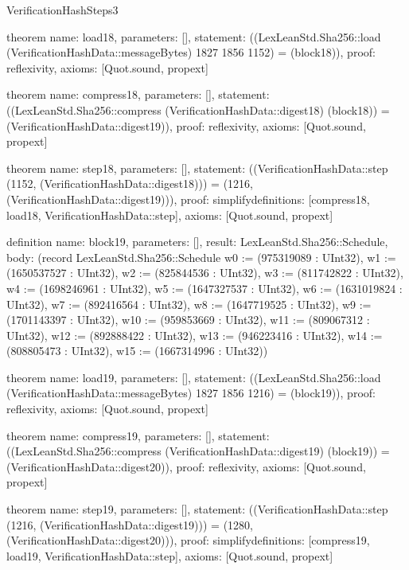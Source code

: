 \begin{lexlean}{VerificationHashSteps3}
\begin{semanticmodule}
theorem{
  name: load18,
  parameters: [],
  statement: ((LexLeanStd.Sha256::load (VerificationHashData::messageBytes) 1827 1856 1152) = (block18)),
  proof: reflexivity{},
  axioms: [Quot.sound, propext]
}

theorem{
  name: compress18,
  parameters: [],
  statement: ((LexLeanStd.Sha256::compress (VerificationHashData::digest18) (block18)) = (VerificationHashData::digest19)),
  proof: reflexivity{},
  axioms: [Quot.sound, propext]
}

theorem{
  name: step18,
  parameters: [],
  statement: ((VerificationHashData::step (1152, (VerificationHashData::digest18))) = (1216, (VerificationHashData::digest19))),
  proof: simplify{definitions: [compress18, load18, VerificationHashData::step]},
  axioms: [Quot.sound, propext]
}

definition{
  name: block19,
  parameters: [],
  result: LexLeanStd.Sha256::Schedule,
  body: (record LexLeanStd.Sha256::Schedule {w0 := (975319089 : UInt32), w1 := (1650537527 : UInt32), w2 := (825844536 : UInt32), w3 := (811742822 : UInt32), w4 := (1698246961 : UInt32), w5 := (1647327537 : UInt32), w6 := (1631019824 : UInt32), w7 := (892416564 : UInt32), w8 := (1647719525 : UInt32), w9 := (1701143397 : UInt32), w10 := (959853669 : UInt32), w11 := (809067312 : UInt32), w12 := (892888422 : UInt32), w13 := (946223416 : UInt32), w14 := (808805473 : UInt32), w15 := (1667314996 : UInt32)})
}

theorem{
  name: load19,
  parameters: [],
  statement: ((LexLeanStd.Sha256::load (VerificationHashData::messageBytes) 1827 1856 1216) = (block19)),
  proof: reflexivity{},
  axioms: [Quot.sound, propext]
}

theorem{
  name: compress19,
  parameters: [],
  statement: ((LexLeanStd.Sha256::compress (VerificationHashData::digest19) (block19)) = (VerificationHashData::digest20)),
  proof: reflexivity{},
  axioms: [Quot.sound, propext]
}

theorem{
  name: step19,
  parameters: [],
  statement: ((VerificationHashData::step (1216, (VerificationHashData::digest19))) = (1280, (VerificationHashData::digest20))),
  proof: simplify{definitions: [compress19, load19, VerificationHashData::step]},
  axioms: [Quot.sound, propext]
}

\end{semanticmodule}
\end{lexlean}
